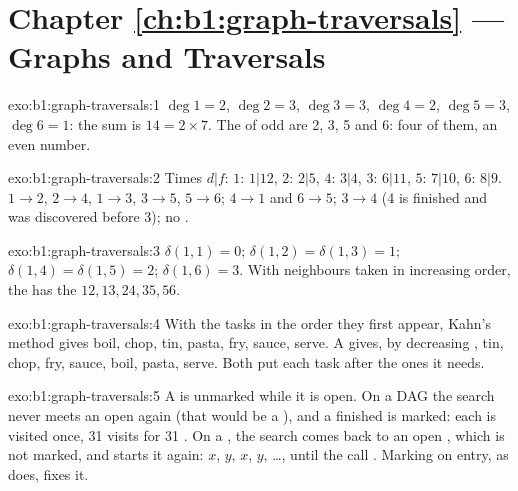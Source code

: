 \section*{Chapter \ref{ch:b1:graph-traversals} --- Graphs and Traversals}

\begin{solution}{exo:b1:graph-traversals:1}
$\deg 1 = 2$, $\deg 2 = 3$, $\deg 3 = 3$, $\deg 4 = 2$, $\deg 5 = 3$, $\deg 6 = 1$: the sum is $14 = 2 \times 7$. The
 of odd  are 2, 3, 5 and 6: four of them, an even number.
\end{solution}

\begin{solution}{exo:b1:graph-traversals:2}
Times $d|f$: $1$: $1|12$, $2$: $2|5$, $4$: $3|4$, $3$: $6|11$, $5$: $7|10$, $6$: $8|9$.  $1 \to 2$, $2 \to 4$,
$1 \to 3$, $3 \to 5$, $5 \to 6$;  $4 \to 1$ and $6 \to 5$;  $3 \to 4$ (4 is finished and was
discovered before 3); no .
\end{solution}

\begin{solution}{exo:b1:graph-traversals:3}
$\delta(1, 1) = 0$; $\delta(1, 2) = \delta(1, 3) = 1$; $\delta(1, 4) = \delta(1, 5) = 2$; $\delta(1, 6) = 3$. With
neighbours taken in increasing order, the  has the  $12, 13, 24, 35, 56$.
\end{solution}

\begin{solution}{exo:b1:graph-traversals:4}
With the tasks in the order they first appear, Kahn's method gives boil, chop, tin, pasta, fry, sauce, serve. A
 gives, by decreasing , tin, chop, fry, sauce, boil, pasta, serve. Both put each task
after the ones it needs.
\end{solution}

\begin{solution}{exo:b1:graph-traversals:5}
A  is unmarked while it is open. On a DAG the search never meets an open  again (that would be a ), and a finished  is marked: each  is visited once, 31 visits for 31 . On a , the search
comes back to an open , which is not marked, and starts it again: $x$, $y$, $x$, $y$, \dots, until the call . Marking on entry, as  does, fixes it.
\end{solution}

